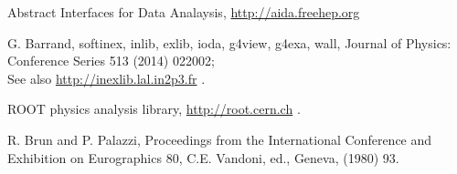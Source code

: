 
 Abstract Interfaces for Data Analaysis, 
                        \url{http://aida.freehep.org}

 G. Barrand, softinex, inlib, exlib, ioda, g4view, g4exa, wall,
                         Journal of Physics: Conference Series 513 (2014) 022002; \\
                         See also \url{http://inexlib.lal.in2p3.fr} .


 ROOT physics analysis library, \url{http://root.cern.ch} .

 R. Brun and P. Palazzi,
                         Proceedings from the International Conference and Exhibition
                         on Eurographics 80,
                         C.E. Vandoni, ed., Geneva, (1980) 93.



